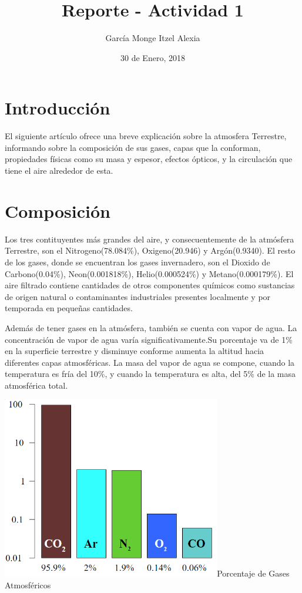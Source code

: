 \documentclass{article} %
\title{Reporte - Actividad 1}
\author{García Monge Itzel Alexia}
\date{30 de Enero, 2018}
\begin{document}
\maketitle

\section{Introducción}
    El siguiente artículo ofrece una breve explicación sobre la atmosfera Terrestre, informando sobre la composición de sus gases, capas que la conforman, propiedades físicas como su masa y espesor, efectos ópticos, y la circulación que tiene el aire alrededor de esta.

\section{Composición}
	Los tres contituyentes más grandes del aire, y consecuentemente de la atmósfera Terrestre, son el Nitrogeno(78.084\%), Oxigeno(20.946) y Argón(0.9340). El resto de los gases, donde se encuentran los gases invernadero, son el Dioxido de Carbono(0.04\%), Neon(0.001818\%), Helio(0.000524\%) y Metano(0.000179\%). El aire filtrado contiene cantidades de otros componentes químicos como sustancias de origen natural o contaminantes industriales presentes localmente y por temporada en pequeñas cantidades.
    
    Además de tener gases en la atmósfera, también se cuenta con vapor de agua. La concentración de vapor de agua varía significativamente.Su porcentaje va de 1\% en la superficie terrestre y disminuye conforme aumenta la altitud hacia diferentes capas atmosféricas. La masa del vapor de agua se compone, cuando la temperatura es fría del 10\%, y cuando la temperatura es alta, del 5\% de la masa atmosférica total.

\includegraphics[height=8cm]{barra.png}{Porcentaje de Gases Atmosféricos}
\end{document}
